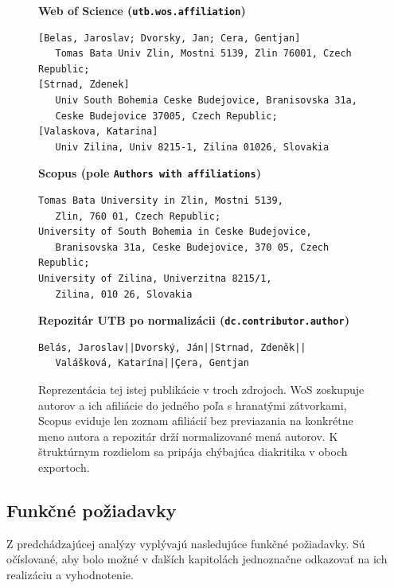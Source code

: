 \begin{figure}[h]
\centering
\begin{minipage}{0.95\textwidth}

\textbf{Web of Science (\texttt{utb.wos.affiliation})}
\begin{verbatim}
[Belas, Jaroslav; Dvorsky, Jan; Cera, Gentjan]
   Tomas Bata Univ Zlin, Mostni 5139, Zlin 76001, Czech Republic;
[Strnad, Zdenek]
   Univ South Bohemia Ceske Budejovice, Branisovska 31a,
   Ceske Budejovice 37005, Czech Republic;
[Valaskova, Katarina]
   Univ Zilina, Univ 8215-1, Zilina 01026, Slovakia
\end{verbatim}

\textbf{Scopus (pole \texttt{Authors with affiliations})}
\begin{verbatim}
Tomas Bata University in Zlin, Mostni 5139,
   Zlin, 760 01, Czech Republic;
University of South Bohemia in Ceske Budejovice,
   Branisovska 31a, Ceske Budejovice, 370 05, Czech Republic;
University of Zilina, Univerzitna 8215/1,
   Zilina, 010 26, Slovakia
\end{verbatim}

\textbf{Repozitár UTB po normalizácii (\texttt{dc.contributor.author})}
\begin{verbatim}
Belás, Jaroslav||Dvorský, Ján||Strnad, Zdeněk||
   Valášková, Katarína||Çera, Gentjan
\end{verbatim}

\end{minipage}
\caption{Reprezentácia tej istej publikácie v troch zdrojoch. WoS zoskupuje autorov a ich afiliácie do jedného poľa s hranatými zátvorkami, Scopus eviduje len zoznam afiliácií bez previazania na konkrétne meno autora a repozitár drží normalizované mená autorov. K štruktúrnym rozdielom sa pripája chýbajúca diakritika v oboch exportoch.}
\label{fig:author-variants}
\end{figure}

\subsection{Funkčné požiadavky}

Z predchádzajúcej analýzy vyplývajú nasledujúce funkčné požiadavky. Sú očíslované, aby bolo možné v ďalších kapitolách jednoznačne odkazovať na ich realizáciu a vyhodnotenie.

